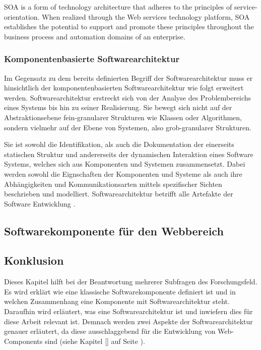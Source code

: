 SOA is a form of technology architecture that adheres to the principles of service-orientation. When realized through the Web services technology platform, SOA establishes the potential to support and promote these principles throughout the business process and automation domains of an enterprise.




\subsubsection{Komponentenbasierte Softwarearchitektur}
\label{sec:2_Komponentenbasierte_Softwarearchitektur}
Im Gegensatz zu dem bereits definierten Begriff der Softwarearchitektur muss er hinsichtlich der komponentenbasierten Softwarearchitektur wie folgt erweitert werden. Softwarearchitektur erstreckt sich von der Analyse des Problembereichs eines Systems bis hin zu seiner Realisierung. Sie bewegt sich nicht auf der Abstraktionsebene fein-granularer Strukturen wie Klassen oder Algorithmen, sondern vielmehr auf der Ebene von Systemen, also grob-granularer Strukturen.

Sie ist sowohl die Identifikation, als auch die Dokumentation der einerseits statischen Struktur und andererseits der dynamischen Interaktion eines Software Systems, welches sich aus Komponenten und Systemen zusammensetzt. Dabei werden sowohl die Eignschaften der Komponenten und Systeme als auch ihre Abhängigkeiten und Kommunikationsarten mittels spezifischer Sichten beschrieben und modelliert. Softwarearchitektur betrifft alle Artefakte der Software Entwicklung \citereset \autocite{Andresen.2003}.





\subsection{Softwarekomponente für den Webbereich}

\label{sec:2_Softwarekomponente_Web}

\subsection{Konklusion}
\label{sec:2_Konklusion}
Dieses Kapitel hilft bei der Beantwortung mehrerer Subfragen des Forschungsfeld. Es wird erklärt wie eine klassische Softwarekomponente definiert ist und in welchen Zusammenhang eine Komponente mit Softwarearchitektur steht. Daraufhin wird erläutert, was eine Softwarearchitektur ist und inwiefern dies für diese Arbeit relevant ist. Demnach werden zwei Aspekte der Softwarearchitektur genauer erläutert, da diese ausschlaggebend für die Entwicklung von Web-Components sind (siehe Kapitel \ref{} auf Seite \pageref{} ).


